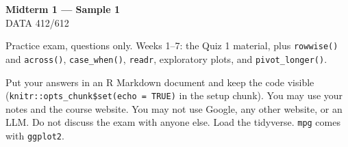 \documentclass[11pt]{article}
\begin{document}
\begin{center}
{\LARGE\bfseries Midterm 1 --- Sample 1}\\[0.35em]
DATA 412/612
\end{center}

\vspace{0.25em}

Practice exam, questions only. Weeks 1--7: the Quiz 1 material,
plus \texttt{rowwise()} and \texttt{across()}, \texttt{case\_when()},
\texttt{readr}, exploratory plots, and \texttt{pivot\_longer()}.

Put your answers in an R Markdown document and keep the code visible
(\texttt{knitr::opts\_chunk\$set(echo = TRUE)} in the setup chunk).
You may use your notes and the course website.
You may not use Google, any other website, or an LLM.
Do not discuss the exam with anyone else.
Load the tidyverse. \texttt{mpg} comes with \texttt{ggplot2}.
\end{document}
